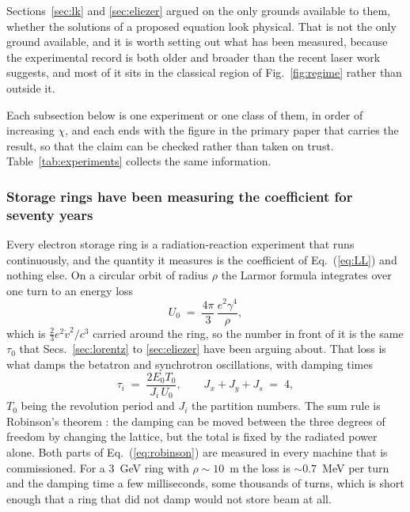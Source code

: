 \documentclass[preprint]{aastex701}
\newcommand{\taunought}{\tau_0}
\begin{document}
Sections~\ref{sec:lk} and \ref{sec:eliezer} argued on the only grounds
available to them, whether the solutions of a proposed equation look physical.
That is not the only ground available, and it is worth setting out what has
been measured, because the experimental record is both older and broader than
the recent laser work suggests, and most of it sits in the classical region of
Fig.~\ref{fig:regime} rather than outside it.

Each subsection below is one experiment or one class of them, in order of
increasing $\chi$, and each ends with the figure in the primary paper that
carries the result, so that the claim can be checked rather than taken on
trust. Table~\ref{tab:experiments} collects the same information.

\subsubsection{Storage rings have been measuring the coefficient for seventy
years}
\label{sec:rings}

Every electron storage ring is a radiation-reaction experiment that runs
continuously, and the quantity it measures is the coefficient of
Eq.~(\ref{eq:LL}) and nothing else. On a circular orbit of radius $\rho$ the
Larmor formula integrates over one turn to an energy loss
\begin{equation}
U_0 \;=\; \frac{4\pi}{3}\,\frac{e^2\gamma^4}{\rho},
\label{eq:U0}
\end{equation}
which is $\tfrac23 e^2\dot v^2/c^3$ carried around the ring, so the number in
front of it is the same $\taunought$ that Secs.~\ref{sec:lorentz} to
\ref{sec:eliezer} have been arguing about. That loss is what damps the betatron
and synchrotron oscillations, with damping times
\begin{equation}
\tau_i \;=\; \frac{2E_0T_0}{J_i\,U_0},
\qquad
J_x+J_y+J_s \;=\; 4,
\label{eq:robinson}
\end{equation}
$T_0$ being the revolution period and $J_i$ the partition numbers. The sum rule
is Robinson's theorem \citep{robinson1958}: the damping can be moved between the
three degrees of freedom by changing the lattice, but the total is fixed by the
radiated power alone. Both parts of Eq.~(\ref{eq:robinson}) are measured in
every machine that is commissioned. For a $3$~GeV ring with $\rho\sim10$~m the
loss is $\sim0.7$~MeV per turn and the damping time a few milliseconds, some
thousands of turns, which is short enough that a ring that did not damp would
not store beam at all.
\end{document}
